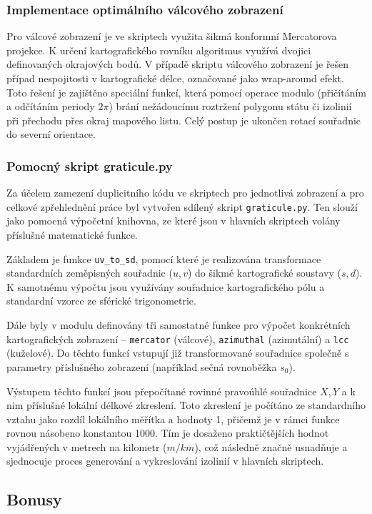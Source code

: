 \documentclass[12pt]{article}
\begin{document}
\subsubsection*{Implementace optimálního válcového zobrazení}
Pro válcové zobrazení je ve skriptech využita šikmá konformní Mercatorova projekce. K určení kartografického rovníku algoritmus využívá dvojici definovaných okrajových bodů. 
V případě skriptu válcového zobrazení je řešen případ nespojitosti v kartografické délce, označované jako wrap-around efekt. Toto řešení je zajištěno speciální funkcí, která pomocí operace modulo (přičítáním a odčítáním periody $2\pi$) brání nežádoucímu roztržení polygonu státu či izolinií při přechodu přes okraj mapového listu. Celý postup je ukončen rotací souřadnic do severní orientace.

\subsubsection*{Pomocný skript graticule.py}

Za účelem zamezení duplicitního kódu ve skriptech pro jednotlivá zobrazení a pro celkové zpřehlednění práce byl vytvořen sdílený skript \texttt{graticule.py}. Ten slouží jako pomocná výpočetní knihovna, ze které jsou v hlavních skriptech volány příslušné matematické funkce.

Základem je funkce \texttt{uv\_to\_sd}, pomocí které je realizována transformace standardních zeměpisných souřadnic ($u, v$) do šikmé kartografické soustavy ($s, d$). K samotnému výpočtu jsou využívány souřadnice kartografického pólu a standardní vzorce ze sférické trigonometrie.

Dále byly v modulu definovány tři samostatné funkce pro výpočet konkrétních kartografických zobrazení – \texttt{mercator} (válcové), \texttt{azimuthal} (azimutální) a \texttt{lcc} (kuželové). Do těchto funkcí vstupují již transformované souřadnice společně s parametry příslušného zobrazení (například sečná rovnoběžka $s_0$).

Výstupem těchto funkcí jsou přepočítané rovinné pravoúhlé souřadnice $X, Y$ a k nim příslušné lokální délkové zkreslení. Toto zkreslení je počítáno ze standardního vztahu jako rozdíl lokálního měřítka a hodnoty 1, přičemž je v rámci funkce rovnou násobeno konstantou 1000. Tím je dosaženo praktičtějších hodnot vyjádřených v metrech na kilometr ($m/km$), což následně značně usnadňuje a sjednocuje proces generování a vykreslování izolinií v hlavních skriptech.

\subsection*{Bonusy}
\end{document}
